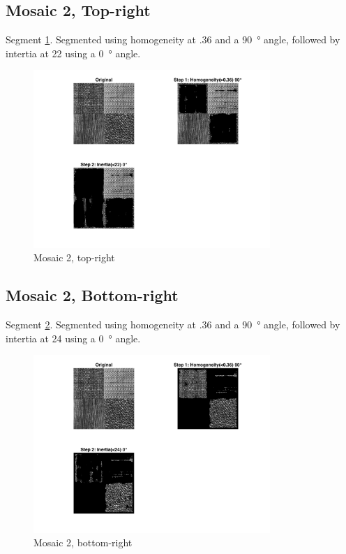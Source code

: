 \documentclass[a4paper,12pt,titlepage]{article}
\begin{document}
\subsection*{Mosaic 2, Top-right} 
Segment \ref{fig:Mosaic2SegmentedTopRight}. Segmented using homogeneity at .36 and a \SI{90}{\degree} angle, followed by intertia at 22 using a \SI{0}{\degree} angle.

\begin{figure}[H]
	\includegraphics[width=0.8\textwidth]{partD-mosaic2-segmentation-top-right}
	\caption{Mosaic 2, top-right}
	\label{fig:Mosaic2SegmentedTopRight}
\end{figure}

\subsection*{Mosaic 2, Bottom-right} 
Segment \ref{fig:Mosaic2SegmentedBottomRight}. Segmented using homogeneity at .36 and a \SI{90}{\degree} angle, followed by intertia at 24 using a \SI{0}{\degree} angle.

\begin{figure}[H]
	\includegraphics[width=0.8\textwidth]{partD-mosaic2-segmentation-bottom-right}
	\caption{Mosaic 2, bottom-right}
	\label{fig:Mosaic2SegmentedBottomRight}
\end{figure}
\end{document}
